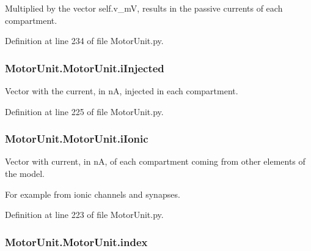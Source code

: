 Multiplied by the vector self.\+v\+\_\+mV, results in the passive currents of each compartment. 

Definition at line 234 of file Motor\+Unit.\+py.

\subsubsection[{\texorpdfstring{i\+Injected}{iInjected}}]{\setlength{\rightskip}{0pt plus 5cm}Motor\+Unit.\+Motor\+Unit.\+i\+Injected}\hypertarget{class_motor_unit_1_1_motor_unit_a06045eca379d38892670a491dbac0829}{}\label{class_motor_unit_1_1_motor_unit_a06045eca379d38892670a491dbac0829}


Vector with the current, in nA, injected in each compartment. 



Definition at line 225 of file Motor\+Unit.\+py.

\subsubsection[{\texorpdfstring{i\+Ionic}{iIonic}}]{\setlength{\rightskip}{0pt plus 5cm}Motor\+Unit.\+Motor\+Unit.\+i\+Ionic}\hypertarget{class_motor_unit_1_1_motor_unit_a0541858216e7d01582312f9a7a99d595}{}\label{class_motor_unit_1_1_motor_unit_a0541858216e7d01582312f9a7a99d595}


Vector with current, in nA, of each compartment coming from other elements of the model. 

For example from ionic channels and synapses. 

Definition at line 223 of file Motor\+Unit.\+py.

\subsubsection[{\texorpdfstring{index}{index}}]{\setlength{\rightskip}{0pt plus 5cm}Motor\+Unit.\+Motor\+Unit.\+index}\hypertarget{class_motor_unit_1_1_motor_unit_a4f3205a9273aabb92d425992d91a1848}{}\label{class_motor_unit_1_1_motor_unit_a4f3205a9273aabb92d425992d91a1848}


